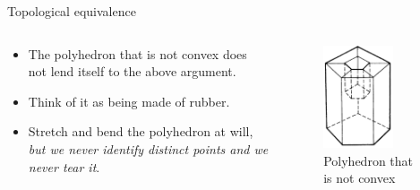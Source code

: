 \documentclass{beamer}
\begin{document}
\begin{frame}{Topological equivalence}
  \begin{columns}
    \begin{column}{0.6\textwidth}
      \begin{block}{}
        \begin{itemize}
        \item The polyhedron that is not convex does not lend itself to the above argument.
        \item Think of it as being made of rubber.
        \item Stretch and bend the polyhedron at will, \textsl{but we never identify distinct points and we never tear it}.
        \end{itemize}
      \end{block}
    \end{column}
    \begin{column}{0.4\textwidth}
      \begin{figure}
        \centering
        \includegraphics[width=0.7\textwidth]{figure_1_8_c.png}
        \caption{Polyhedron that is not convex}
      \end{figure}
    \end{column}
  \end{columns}
\end{frame}
\end{document}
